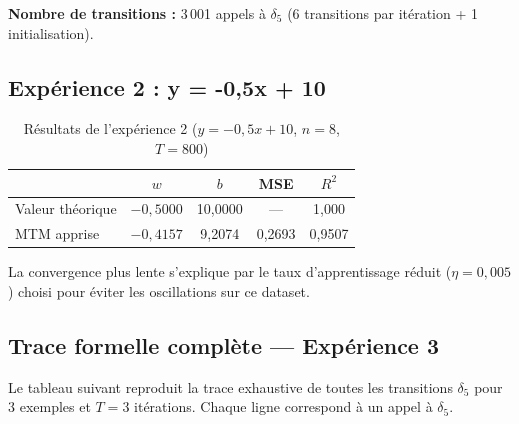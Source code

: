 \documentclass[12pt, a4paper, oneside]{report}
\begin{document}
\noindent\textbf{Nombre de transitions :} 3\,001 appels à $\delta_5$ (6 transitions par itération + 1 initialisation).

\subsection{Expérience 2 : y = -0{,}5x + 10}

\begin{table}[H]
  \centering
  \caption{Résultats de l'expérience 2 ($y = -0{,}5x+10$, $n=8$, $T=800$)}
  \label{tab:res2}
  \renewcommand{\arraystretch}{1.3}
  \begin{tabular}{lcccc}
    \toprule
    & $w$ & $b$ & MSE & $R^2$ \\
    \midrule
    Valeur théorique & $-0{,}5000$ & 10{,}0000 & — & 1{,}000 \\
    MTM apprise       & $-0{,}4157$ & 9{,}2074  & 0{,}2693 & 0{,}9507 \\
    \bottomrule
  \end{tabular}
\end{table}

La convergence plus lente s'explique par le taux d'apprentissage réduit ($\eta = 0{,}005$) choisi pour éviter les oscillations sur ce dataset.

\subsection{Trace formelle complète — Expérience 3}

Le tableau suivant reproduit la trace exhaustive de toutes les transitions $\delta_5$ pour 3 exemples et $T=3$ itérations. Chaque ligne correspond à un appel à $\delta_5$.
\end{document}
